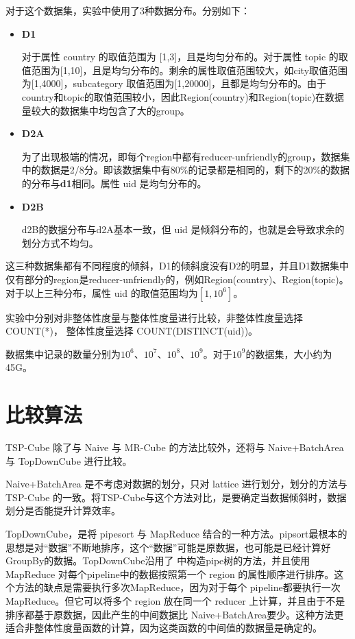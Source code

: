对于这个数据集，实验中使用了3种数据分布。分别如下：
\begin{itemize}

\item \textbf{D1}

对于属性 country 的取值范围为 [1,3]，且是均匀分布的。对于属性 topic 的取值范围为[1,10]，且是均匀分布的。剩余的属性取值范围较大，如city取值范围为[1,4000]，subcategory 取值范围为[1,20000]，且都是均匀分布的。由于country和topic的取值范围较小，因此Region(country)和Region(topic)在数据量较大的数据集中均包含了大的group。

\item \textbf{D2A}

为了出现极端的情况，即每个region中都有reducer-unfriendly的group，数据集中的数据是2/8分。即该数据集中有80\%的记录都是相同的，剩下的20\%的数据的分布与\textbf{d1}相同。属性 uid 是均匀分布的。

\item \textbf{D2B}

d2B的数据分布与d2A基本一致，但 uid 是倾斜分布的，也就是会导致求余的划分方式不均匀。

\end{itemize}

这三种数据集都有不同程度的倾斜，D1的倾斜度没有D2的明显，并且D1数据集中仅有部分的region是reducer-unfriendly的，例如Region(country)、Region(topic)。对于以上三种分布，属性 uid 的取值范围均为$[1,{10}^{6}]$。

实验中分别对非整体性度量与整体性度量进行比较，非整体性度量选择 COUNT(*)， 整体性度量选择 COUNT(DISTINCT(uid))。

数据集中记录的数量分别为${10}^{6}$、${10}^{7}$、${10}^{8}$、${10}^{9}$。对于${10}^{9}$的数据集，大小约为45G。


\section{比较算法}

TSP-Cube 除了与 Naive 与 MR-Cube 的方法比较外，还将与 Naive+BatchArea 与 TopDownCube \cite{lee2012efficient} 进行比较。

Naive+BatchArea 是不考虑对数据的划分，只对 lattice 进行划分，划分的方法与 TSP-Cube 的一致。将TSP-Cube与这个方法对比，是要确定当数据倾斜时，数据划分是否能提升计算效率。

TopDownCube，是将 pipesort 与 MapReduce 结合的一种方法。pipsort最根本的思想是对``数据”不断地排序，这个``数据”可能是原数据，也可能是已经计算好GroupBy的数据。TopDownCube沿用了\cite{agarwal1996computation} 中构造pipe树的方法，并且使用 MapReduce 对每个pipeline中的数据按照第一个 region 的属性顺序进行排序。这个方法的缺点是需要执行多次MapReduce，因为对于每个 pipeline都要执行一次 MapReduce。但它可以将多个 region 放在同一个 reducer 上计算，并且由于不是排序都基于原数据，因此产生的中间数据比 Naive+BatchArea要少。这种方法更适合非整体性度量函数的计算，因为这类函数的中间值的数据量是确定的。

